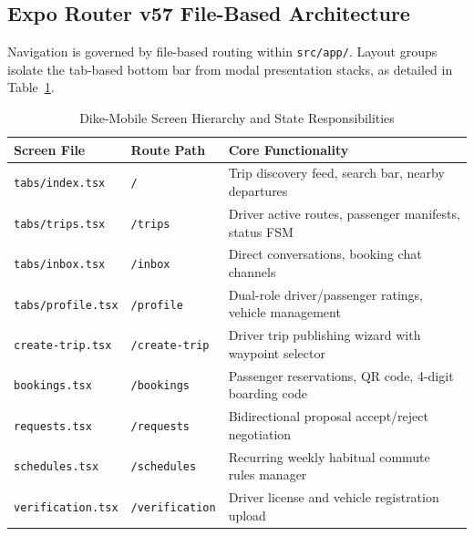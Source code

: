 \documentclass[conference,10pt,a4paper]{IEEEtran}
\begin{document}
\subsection{Expo Router v57 File-Based Architecture}
Navigation is governed by file-based routing within \texttt{src/app/}. Layout groups isolate the tab-based bottom bar from modal presentation stacks, as detailed in Table~\ref{tab:mobile_routes}.

\begin{table}[!ht]
\caption{Dike-Mobile Screen Hierarchy and State Responsibilities}
\label{tab:mobile_routes}
\centering
\scriptsize
\begin{tabularx}{\columnwidth}{p{2.3cm}p{1.4cm}X}
\toprule
\textbf{Screen File} & \textbf{Route Path} & \textbf{Core Functionality} \\
\midrule
\texttt{tabs/index.tsx} & \texttt{/} & Trip discovery feed, search bar, nearby departures \\
\texttt{tabs/trips.tsx} & \texttt{/trips} & Driver active routes, passenger manifests, status FSM \\
\texttt{tabs/inbox.tsx} & \texttt{/inbox} & Direct conversations, booking chat channels \\
\texttt{tabs/profile.tsx} & \texttt{/profile} & Dual-role driver/passenger ratings, vehicle management \\
\texttt{create-trip.tsx} & \texttt{/create-trip} & Driver trip publishing wizard with waypoint selector \\
\texttt{bookings.tsx} & \texttt{/bookings} & Passenger reservations, QR code, 4-digit boarding code \\
\texttt{requests.tsx} & \texttt{/requests} & Bidirectional proposal accept/reject negotiation \\
\texttt{schedules.tsx} & \texttt{/schedules} & Recurring weekly habitual commute rules manager \\
\texttt{verification.tsx} & \texttt{/verification} & Driver license and vehicle registration upload \\
\bottomrule
\end{tabularx}
\end{table}
\end{document}
